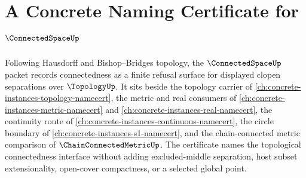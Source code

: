 \chapter{A Concrete Naming Certificate for $\ConnectedSpaceUp$}
\label{ch:concrete-instances-connected-space-namecert}

Following Hausdorff and Bishop--Bridges topology, the $\ConnectedSpaceUp$ packet records connectedness as a finite refusal surface for displayed clopen separations over $\TopologyUp$. It sits beside the topology carrier of \autoref{ch:concrete-instances-topology-namecert}, the metric and real consumers of \autoref{ch:concrete-instances-metric-namecert} and \autoref{ch:concrete-instances-real-namecert}, the continuity route of \autoref{ch:concrete-instances-continuous-namecert}, the circle boundary of \autoref{ch:concrete-instances-s1-namecert}, and the chain-connected metric comparison of $\ChainConnectedMetricUp$. The certificate names the topological connectedness interface without adding excluded-middle separation, host subset extensionality, open-cover compactness, or a selected global point.

